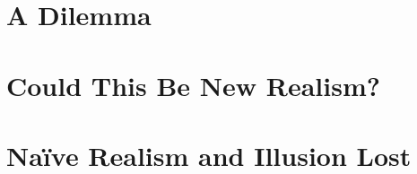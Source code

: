 \documentclass[12pt]{article}
\begin{document}

\section{A Dilemma}\label{sec:a_dilemma} %




\section{Could This Be New Realism?}\label{sec:could_this_be_new_realism_} %




\section{Naïve Realism and Illusion Lost}\label{sec:naïve_realism_and_illusion_lost} %




 
 
\end{document}
